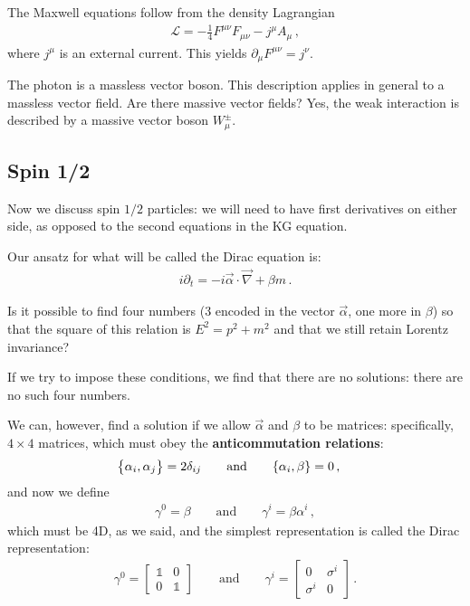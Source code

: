 \documentclass[main.tex]{subfiles}
\begin{document}
The Maxwell equations follow from the density Lagrangian 
%
\begin{align}
\mathscr{L} = - \frac{1}{4} F^{\mu \nu } F_{\mu \nu } - j^{\mu } A_{\mu }
\,,
\end{align}
%
where \(j^{\mu }\) is an external current. This yields \(\partial_{\mu } F^{\mu \nu } = j^{\nu }\). 

The photon is a massless vector boson. This description applies in general to a massless vector field. 
Are there massive vector fields?
Yes, the weak interaction is described by a massive vector boson \(W^{\pm}_{\mu }\).

\subsection{Spin 1/2}

Now we discuss spin \(1/2\) particles: we will need to have first derivatives on either side, as opposed to the second equations in the KG equation.

Our ansatz for what will be called the Dirac equation is: 
%
\begin{align}
i \partial_{t} = - i \vec{\alpha} \cdot \vec{\nabla} + \beta m
\,.
\end{align}

Is it possible to find four numbers (3 encoded in the vector \(\vec{\alpha} \), one more in \(\beta \)) so that the square of this relation is \(E^2 = p^2+m^2\) and that we still retain Lorentz invariance? 

If we try to impose these conditions, we find that there are no solutions: there are no such four numbers. 

We can, however, find a solution if we allow \(\vec{\alpha}\) and \(\beta \) to be matrices: specifically, \(4 \times 4 \) matrices, which must obey the \textbf{anticommutation relations}: 
%
\begin{align}
\qty{\alpha_{i}, \alpha_{j}} &= 2\delta_{ij} 
\qquad \text{and} \qquad
\qty{\alpha_{i}, \beta } = 0
\,,
\end{align}
%
and now we define 
%
\begin{align}
\gamma^{0} = \beta 
\qquad \text{and} \qquad
\gamma^{i} = \beta \alpha^{i}
\,,
\end{align}
%
which must be 4D, as we said, and the simplest representation is called the Dirac representation:
%
\begin{subequations}
\begin{align}
\gamma^{0} = \left[\begin{array}{cc}
\mathbb{1} & 0 \\ 
0 & \mathbb{1}
\end{array}\right] 
\qquad \text{and} \qquad
\gamma^{i} = \left[\begin{array}{cc}
0 & \sigma^{i}   \\ 
\sigma^{i} & 0
\end{array}\right]
\,.
\end{align}
\end{subequations}
\end{document}
